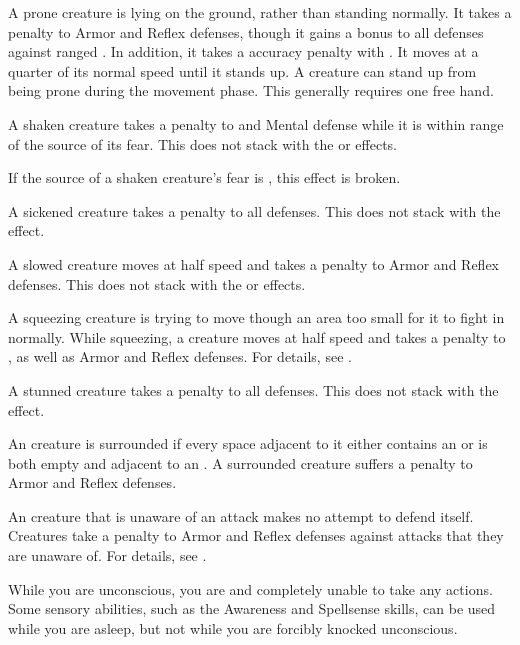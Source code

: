  A prone creature is lying on the ground, rather than standing normally.
It takes a  penalty to Armor and Reflex defenses, though it gains a  bonus to all defenses against ranged .
In addition, it takes a  accuracy penalty with .
It moves at a quarter of its normal speed until it stands up.
A creature can stand up from being prone during the movement phase.
This generally requires one free hand.

 A shaken creature takes a  penalty to  and Mental defense while it is within \rngmed range of the source of its fear.
This does not stack with the \frightened or \panicked effects.

If the source of a shaken creature's fear is , this effect is broken.

 A sickened creature takes a  penalty to all defenses.
This does not stack with the \nauseated effect.

 A slowed creature moves at half speed and takes a  penalty to Armor and Reflex defenses.
This does not stack with the \decelerated or \immobilized effects.

 A squeezing creature is trying to move though an area too small for it to fight in normally.
While squeezing, a creature moves at half speed and takes a  penalty to , as well as Armor and Reflex defenses.
For details, see .

 A stunned creature takes a  penalty to all defenses.
This does not stack with the \dazed effect.

 An creature is surrounded if every space adjacent to it either contains an  or is both empty and adjacent to an .
A surrounded creature suffers a  penalty to Armor and Reflex defenses.

 An creature that is unaware of an attack makes no attempt to defend itself.
Creatures take a  penalty to Armor and Reflex defenses against attacks that they are unaware of.
For details, see .

 While you are unconscious, you are \helpless and completely unable to take any actions.
Some sensory abilities, such as the Awareness and Spellsense skills, can be used while you are asleep, but not while you are forcibly knocked unconscious.

